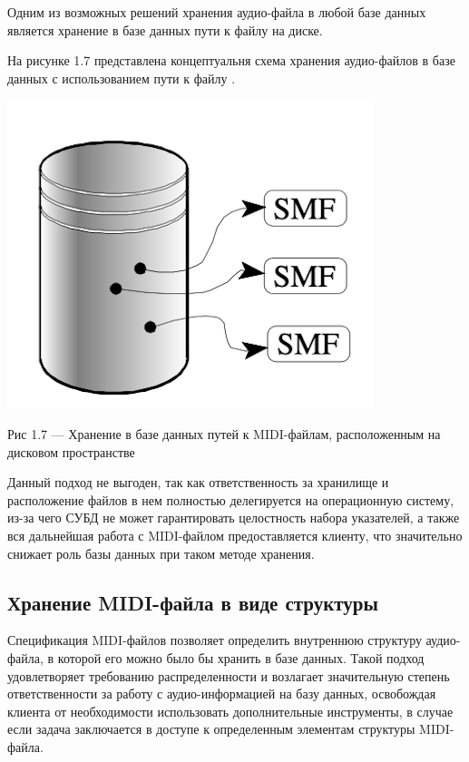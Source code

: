 Одним из возможных решений хранения аудио-файла в любой базе данных является хранение в базе данных пути к файлу на диске.

На рисунке 1.7 представлена концептуальня схема хранения аудио-файлов в базе данных с использованием пути к файлу \cite{CBMS}.
\begin{center}
		\includegraphics[scale=0.7]{img/disk}
		
			Рис 1.7 — Хранение в базе данных путей к MIDI-файлам, расположенным на дисковом пространстве
\end{center} 

Данный подход не выгоден, так как ответственность за хранилище и расположение файлов в нем полностью делегируется на операционную систему, из-за чего СУБД не может гарантировать целостность набора указателей, а также вся дальнейшая работа с MIDI-файлом предоставляется клиенту, что значительно снижает роль базы данных при таком методе хранения. 

\subsection{Хранение MIDI-файла в виде структуры}

Спецификация MIDI-файлов \cite{SMFFS} позволяет определить внутреннюю структуру аудио-файла, в которой его можно было бы хранить в базе данных. Такой подход удовлетворяет требованию распределенности и возлагает значительную степень ответственности за работу с аудио-информацией на базу данных, освобождая клиента от необходимости использовать дополнительные инструменты, в случае если задача заключается в доступе к определенным элементам структуры MIDI-файла. 

